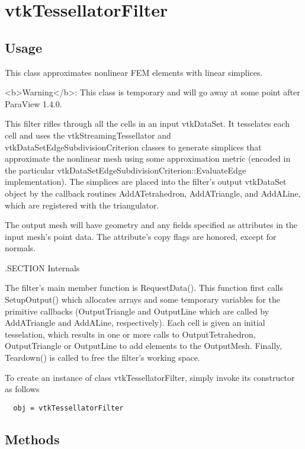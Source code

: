 \section{vtkTessellatorFilter}

\subsection{Usage}

 This class approximates nonlinear FEM elements with linear simplices.

 <b>Warning</b>: This class is temporary and will go away at some point
 after ParaView 1.4.0.

 This filter rifles through all the cells in an input vtkDataSet. It
 tesselates each cell and uses the vtkStreamingTessellator and
 vtkDataSetEdgeSubdivisionCriterion classes to generate simplices that
 approximate the nonlinear mesh using some approximation metric (encoded
 in the particular vtkDataSetEdgeSubdivisionCriterion::EvaluateEdge
 implementation). The simplices are placed into the filter's output
 vtkDataSet object by the callback routines AddATetrahedron,
 AddATriangle, and AddALine, which are registered with the triangulator.

 The output mesh will have geometry and any fields specified as
 attributes in the input mesh's point data.  The attribute's copy flags
 are honored, except for normals.

 .SECTION Internals

 The filter's main member function is RequestData(). This function first
 calls SetupOutput() which allocates arrays and some temporary variables
 for the primitive callbacks (OutputTriangle and OutputLine which are
 called by AddATriangle and AddALine, respectively).  Each cell is given
 an initial tesselation, which results in one or more calls to
 OutputTetrahedron, OutputTriangle or OutputLine to add elements to the
 OutputMesh. Finally, Teardown() is called to free the filter's working
 space.


To create an instance of class vtkTessellatorFilter, simply
invoke its constructor as follows
\begin{verbatim}
  obj = vtkTessellatorFilter
\end{verbatim}
\subsection{Methods}

